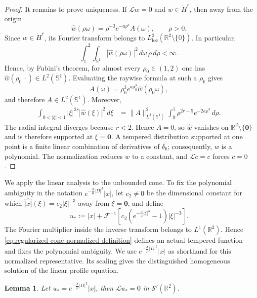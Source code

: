 \documentclass[12pt]{amsart}
\newtheorem{lemma}[theorem]{Lemma}
\theoremstyle{remark}
\theoremstyle{definition}
\numberwithin{equation}{section}
\newcommand{\R}{\mathbb{R}}
\begin{document}
\begin{proof}
It remains to prove uniqueness. If \(\mathcal Lw=0\) and
\(w\in\dot H^r\), then away from the origin
\[
 \widehat w(\rho\omega)=\rho^{-3}e^{-a\rho^3}A(\omega),
 \qquad \rho>0.
\]
Since \(w\in\dot H^r\), its Fourier transform belongs to
\(L^2_{\mathrm{loc}}(\R^2\setminus\{0\})\).  In particular,
\[
 \int_1^2\int_{\mathbb S^1}
 |\widehat w(\rho\omega)|^2\,d\omega\,\rho\,d\rho
 <\infty.
\]
Hence, by Fubini's theorem, for almost every
\(\rho_0\in(1,2)\) one has
\(\widehat w(\rho_0\,\cdot)\in L^2(\mathbb S^1)\).
Evaluating the raywise formula at such a \(\rho_0\) gives
\[
 A(\omega)
 =
 \rho_0^3e^{a\rho_0^3}\widehat w(\rho_0\omega),
\]
and therefore \(A\in L^2(\mathbb S^1)\).
Moreover,
\begin{align*} 
\int_{0<|\xi|<1} 
|\xi|^{2r}|\widehat w(\xi)|^2\,d\xi 
&= 
\|A\|_{L^2(\mathbb S^1)}^2 
\int_0^1 
\rho^{2r-5}e^{-2a\rho^3}\,d\rho.
\end{align*}
The radial integral diverges because \(r<2\). 
Hence \(A=0\), so \(\widehat w\) vanishes on \(\R^2\setminus\{\mathbf{0}\}\) and is therefore supported at \(\xi= \mathbf{0}\).  
A tempered distribution supported at one point is a finite linear combination of derivatives of \(\delta_0\); consequently, \(w\) is a polynomial.
The normalization reduces \(w\) to a constant, and \(\mathcal Lc=c\) forces \(c=0\).
\end{proof}

We apply the linear analysis to the unbounded cone. 
To fix the polynomial ambiguity in the notation
\(e^{-\frac{\sigma}{\mu}|D|^3}|x|\), let \(c_2\neq0\) be the dimensional
constant for which \(\widehat{|x|}(\xi)=c_2|\xi|^{-3}\) away from
\(\xi= \mathbf{0}\), and define
\begin{equation}
\label{eq:regularized-cone-normalized-definition}
 u_*:=|x|+\mathcal F^{-1}\left[c_2\left(e^{-\frac{\sigma}{\mu}|\xi|^3}-1\right)|\xi|^{-3}\right].
\end{equation}
The Fourier multiplier inside the inverse transform belongs to \(L^1(\R^2)\).
Hence \eqref{eq:regularized-cone-normalized-definition} defines an actual tempered function and fixes the polynomial ambiguity.
We use \(e^{-\frac{\sigma}{\mu}|D|^3}|x|\) as shorthand for this normalized representative. 
Its scaling gives the distinguished homogeneous solution of the linear profile equation.

\begin{lemma}
\label{lem:regularized-cone-kernel}
Let $u_*=e^{-\frac{\sigma}{\mu}|D|^3}|x|$, then \(\mathcal Lu_*=0\) in \(\mathcal S'(\R^2)\).
\end{lemma}
\end{document}

